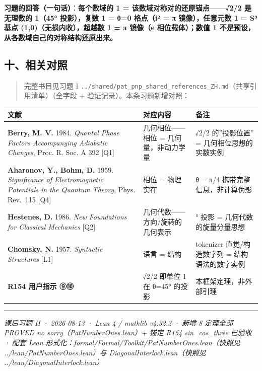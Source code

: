 \documentclass[
]{article}
\newcounter{none} %
\begin{document}
\textbf{习题的回答（一句话）}：\textbf{每个数域的 1 =
该数域对称对的还原锚点------√2/2 是无理数的 1（45° 投影），复数 1 = θ=0
格点（i² = π 镜像），任意元数 1 = S³ 基点 (1,0)（无损内收），超越数 1 =
π 镜像（e 相位载体）；数值 1 不是预设，从各数域自己的对称结构还原出来。}

\subsection{十、相关对照}\label{ux5341ux76f8ux5173ux5bf9ux7167}

\begin{quote}
完整书目见习题 I
\texttt{../shared/pat\_pnp\_shared\_references\_ZH.md}（共享引用清单）（全字段
+ 验证记录）。本条习题新增对照：
\end{quote}

{\def\LTcaptype{none} %
\begin{longtable}[]{@{}
 >{\raggedright\arraybackslash}p{}
 >{\raggedright\arraybackslash}p{}
 >{\raggedright\arraybackslash}p{}@{}}
\toprule\noalign{}
\begin{minipage}[b]{\linewidth}\raggedright
文献
\end{minipage} & \begin{minipage}[b]{\linewidth}\raggedright
对应内容
\end{minipage} & \begin{minipage}[b]{\linewidth}\raggedright
备注
\end{minipage} \\
\midrule\noalign{}
\endhead
\bottomrule\noalign{}
\endlastfoot
\textbf{Berry, M. V.} 1984. \emph{Quantal Phase Factors Accompanying
Adiabatic Changes}, Proc. R. Soc. A 392 {[}Q1{]} & 几何相位------相位 =
几何量，非动力学量 & √2/2 的''投影位置'' = 几何相位思想的实数实例 \\
\textbf{Aharonov, Y., Bohm, D.} 1959. \emph{Significance of
Electromagnetic Potentials in the Quantum Theory}, Phys. Rev.~115
{[}Q4{]} & 相位 = 物理实在 & θ = π/4 携带完整信息，非计算伪影 \\
\textbf{Hestenes, D.} 1986. \emph{New Foundations for Classical
Mechanics} {[}Q2{]} & 几何代数------方向/旋转的几何表示 & 45° 投影 =
几何代数的旋量分量思想 \\
\textbf{Chomsky, N.} 1957. \emph{Syntactic Structures} {[}L1{]} & 语言 =
结构 & tokenizer 直觉/构造数字列 = 结构语法的数字实例 \\
\textbf{R154 用户指示 ⑨⑩} & √2/2 即单位 1 在 θ=45° 的投影 &
本框架定理，非外部引理 \\
\end{longtable}
}

\begin{center}\rule{0.5\linewidth}{0.5pt}\end{center}

\emph{课后习题 II · 2026-08-13 · Lean 4 / mathlib v4.32.2 · 新增 8
定理全部 PROVED no sorry（PatNumberOnes.lean）+ 锚定 R154
sin\_cos\_three 已验收 · 配套 Lean
形式化：formal/Formal/Toolkit/PatNumberOnes.lean（快照见
../lean/PatNumberOnes.lean）与 DiagonalInterlock.lean（快照见
../lean/DiagonalInterlock.lean）}
\end{document}
